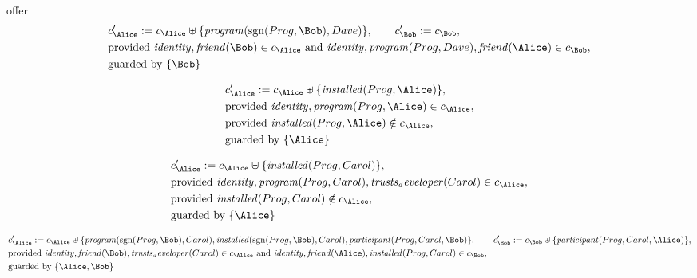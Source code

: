 offer
\fi
\begin{align*}
&
c'_
{
\Alice
}
 := 
c_
{
\Alice
}
 \uplus 
\{
\mathit{
program
}
(
\mathrm{sgn}(
Prog
,
\Bob
)
,
Dave
)
\}
, \qquad 
c'_
{
\Bob
}
 := 
c_
{
\Bob
}
,\\
&
\text{provided } 
\mathit{
identity
}
,
\mathit{
friend
}
(
\Bob
)
 \in c_
{
\Alice
}
 \text{ and } 
\mathit{
identity
}
,
\mathit{
program
}
(
Prog
,
Dave
)
,
\mathit{
friend
}
(
\Alice
)
 \in c_
{
\Bob
}
,\\
&
\text{guarded by } \{
\Bob
\}
\end{align*}

\begin{align*}
&
c'_
{
\Alice
}
 := 
c_
{
\Alice
}
 \uplus 
\{
\mathit{
installed
}
(
Prog
,
\Alice
)
\}
,\\
&
\text{provided } 
\mathit{
identity
}
,
\mathit{
program
}
(
Prog
,
\Alice
)
 \in c_
{
\Alice
}
,\\
&
\text{provided } 
\mathit{
installed
}
(
Prog
,
\Alice
)
 \notin c_
{
\Alice
}
,\\
&
\text{guarded by } \{
\Alice
\}
\end{align*}

\begin{align*}
&
c'_
{
\Alice
}
 := 
c_
{
\Alice
}
 \uplus 
\{
\mathit{
installed
}
(
Prog
,
Carol
)
\}
,\\
&
\text{provided } 
\mathit{
identity
}
,
\mathit{
program
}
(
Prog
,
Carol
)
,
\mathit{
trusts_developer
}
(
Carol
)
 \in c_
{
\Alice
}
,\\
&
\text{provided } 
\mathit{
installed
}
(
Prog
,
Carol
)
 \notin c_
{
\Alice
}
,\\
&
\text{guarded by } \{
\Alice
\}
\end{align*}

\begin{align*}
&
c'_
{
\Alice
}
 := 
c_
{
\Alice
}
 \uplus 
\{
\mathit{
program
}
(
\mathrm{sgn}(
Prog
,
\Bob
)
,
Carol
)
,
\mathit{
installed
}
(
\mathrm{sgn}(
Prog
,
\Bob
)
,
Carol
)
,
\mathit{
participant
}
(
Prog
,
Carol
,
\Bob
)
\}
, \qquad 
c'_
{
\Bob
}
 := 
c_
{
\Bob
}
 \uplus 
\{
\mathit{
participant
}
(
Prog
,
Carol
,
\Alice
)
\}
,\\
&
\text{provided } 
\mathit{
identity
}
,
\mathit{
friend
}
(
\Bob
)
,
\mathit{
trusts_developer
}
(
Carol
)
 \in c_
{
\Alice
}
 \text{ and } 
\mathit{
identity
}
,
\mathit{
friend
}
(
\Alice
)
,
\mathit{
installed
}
(
Prog
,
Carol
)
 \in c_
{
\Bob
}
,\\
&
\text{guarded by } \{
\Alice
,
\Bob
\}
\end{align*}
\iffalse
